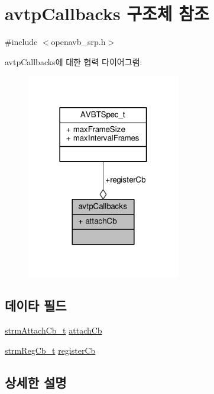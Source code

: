 \hypertarget{structavtp_callbacks}{}\section{avtp\+Callbacks 구조체 참조}
\label{structavtp_callbacks}


{\ttfamily \#include $<$openavb\+\_\+srp.\+h$>$}



avtp\+Callbacks에 대한 협력 다이어그램\+:
\nopagebreak
\begin{figure}[H]
\begin{center}
\leavevmode
\includegraphics[width=190pt]{structavtp_callbacks__coll__graph}
\end{center}
\end{figure}
\subsection*{데이타 필드}
\begin{DoxyCompactItemize}
\item 
\hyperlink{openavb__srp__api_8h_a8faf9e59dac2023b4de44b14a1afa2c5}{strm\+Attach\+Cb\+\_\+t} \hyperlink{structavtp_callbacks_a781766ada1fd0cb6a2cf5ffddf6b5ff9}{attach\+Cb}
\item 
\hyperlink{openavb__srp__api_8h_ae48089e2cba0329cce9d9f0894634e86}{strm\+Reg\+Cb\+\_\+t} \hyperlink{structavtp_callbacks_a3c076b57292d2fbf6085897c9f921a98}{register\+Cb}
\end{DoxyCompactItemize}


\subsection{상세한 설명}



